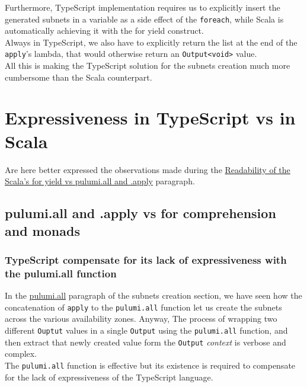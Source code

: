 Furthermore, TypeScript implementation requires us to explicitly insert the generated subnets in a variable as a side effect of the \texttt{foreach}, while Scala is automatically achieving it with the for yield construct.\\
Always in TypeScript, we also have to explicitly return the list at the end of the \texttt{apply}'s lambda, that would otherwise return an \texttt{Output<void>} value.\\
All this is making the TypeScript solution for the subnets creation much more cumbersome than the Scala counterpart.


\section{Expressiveness in TypeScript vs in Scala}
Are here better expressed the observations made during the \hyperref[sssec:readability-for-yield]{Readability of the Scala's for yield vs pulumi.all and .apply} paragraph.

\subsection{pulumi.all and .apply vs for comprehension and monads}

\subsubsection{TypeScript compensate for its lack of expressiveness with the pulumi.all function}
In the \hyperref[sssec:pulumi-all]{pulumi.all} paragraph of the subnets creation section, we have seen how the concatenation of \texttt{apply} to the \texttt{pulumi.all} function let us create the subnets across the various availability zones.
Anyway, The process of wrapping two different \texttt{Ouptut} values in a single \texttt{Output} using the \texttt{pulumi.all} function, and then extract that newly created value form the \texttt{Output} \textit{context} is verbose and complex.\\
The \texttt{pulumi.all} function is effective but its existence is required to compensate for the lack of expressiveness of the TypeScript language.

